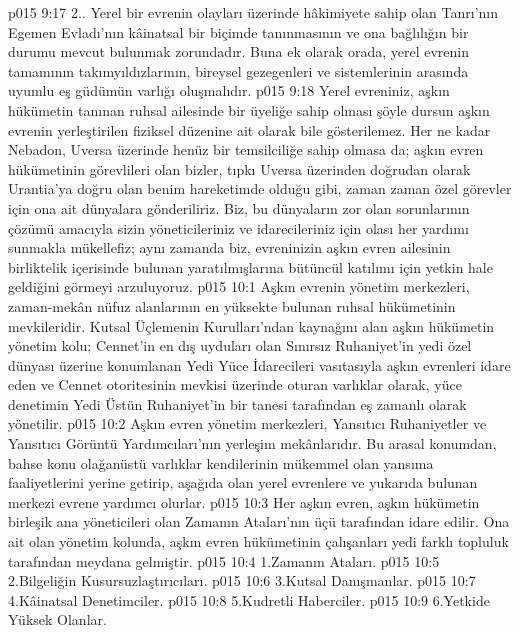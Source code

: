 \vs p015 9:17 2.\bibnobreakspace {}. Yerel bir evrenin olayları üzerinde hâkimiyete sahip olan Tanrı’nın Egemen Evladı’nın kâinatsal bir biçimde tanınmasının ve ona bağlılığın bir durumu mevcut bulunmak zorundadır. Buna ek olarak orada, yerel evrenin tamamının takımyıldızlarının, bireysel gezegenleri ve sistemlerinin arasında uyumlu eş güdümün varlığı oluşmalıdır.
\vs p015 9:18 Yerel evreniniz, aşkın hükümetin tanınan ruhsal ailesinde bir üyeliğe sahip olması şöyle dursun aşkın evrenin yerleştirilen fiziksel düzenine ait olarak bile gösterilemez. Her ne kadar Nebadon, Uversa üzerinde henüz bir temsilciliğe sahip olmasa da; aşkın evren hükümetinin görevlileri olan bizler, tıpkı Uversa üzerinden doğrudan olarak Urantia’ya doğru olan benim hareketimde olduğu gibi, zaman zaman özel görevler için ona ait dünyalara gönderiliriz. Biz, bu dünyaların zor olan sorunlarının çözümü amacıyla sizin yöneticileriniz ve idarecileriniz için olası her yardımı sunmakla mükellefiz; aynı zamanda biz, evreninizin aşkın evren ailesinin birliktelik içerisinde bulunan yaratılmışlarına bütüncül katılımı için yetkin hale geldiğini görmeyi arzuluyoruz.
\vs p015 10:1 Aşkın evrenin yönetim merkezleri, zaman\hyp{}mekân nüfuz alanlarının en yüksekte bulunan ruhsal hükümetinin mevkileridir. Kutsal Üçlemenin Kurulları’ndan kaynağını alan aşkın hükümetin yönetim kolu; Cennet’in en dış uyduları olan Sınırsız Ruhaniyet’in yedi özel dünyası üzerine konumlanan Yedi Yüce İdarecileri vasıtasıyla aşkın evrenleri idare eden ve Cennet otoritesinin mevkisi üzerinde oturan varlıklar olarak, yüce denetimin Yedi Üstün Ruhaniyet’in bir tanesi tarafından eş zamanlı olarak yönetilir.
\vs p015 10:2 Aşkın evren yönetim merkezleri, Yansıtıcı Ruhaniyetler ve Yansıtıcı Görüntü Yardımcıları’nın yerleşim mekânlarıdır. Bu arasal konumdan, bahse konu olağanüstü varlıklar kendilerinin mükemmel olan yansıma faaliyetlerini yerine getirip, aşağıda olan yerel evrenlere ve yukarıda bulunan merkezi evrene yardımcı olurlar.
\vs p015 10:3 Her aşkın evren, aşkın hükümetin birleşik ana yöneticileri olan Zamanın Ataları’nın üçü tarafından idare edilir. Ona ait olan yönetim kolunda, aşkın evren hükümetinin çalışanları yedi farklı topluluk tarafından meydana gelmiştir.
\vs p015 10:4 1.\bibnobreakspace Zamanın Ataları.
\vs p015 10:5 2.\bibnobreakspace Bilgeliğin Kusursuzlaştırıcıları.
\vs p015 10:6 3.\bibnobreakspace Kutsal Danışmanlar.
\vs p015 10:7 4.\bibnobreakspace Kâinatsal Denetimciler.
\vs p015 10:8 5.\bibnobreakspace Kudretli Haberciler.
\vs p015 10:9 6.\bibnobreakspace Yetkide Yüksek Olanlar.
